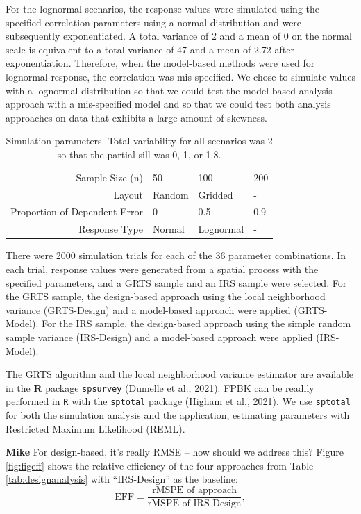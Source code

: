 \documentclass[]{elsarticle} %
\begin{document}
For the lognormal scenarios, the response values were simulated using
the specified correlation parameters using a normal distribution and
were subsequently exponentiated. A total variance of 2 and a mean of 0
on the normal scale is equivalent to a total variance of 47 and a mean
of 2.72 after exponentiation. Therefore, when the model-based methods
were used for lognormal response, the correlation was mis-specified. We
chose to simulate values with a lognormal distribution so that we could
test the model-based analysis approach with a mis-specified model and so
that we could test both analysis approaches on data that exhibits a
large amount of skewness.

\begin{table}[ht]
\centering
\begin{tabular}{r|lll}
   \hline
Sample Size (n) & 50 & 100 & 200 \\ 
  Layout & Random & Gridded & - \\ 
  Proportion of Dependent Error & 0 & 0.5 & 0.9 \\ 
  Response Type & Normal & Lognormal & - \\ 
   \hline
\end{tabular}
\caption{\label{tab:parmtab} Simulation parameters. Total variability for all scenarios was 2 so that the partial sill was 0, 1, or 1.8.} 
\end{table}

There were 2000 simulation trials for each of the 36 parameter
combinations. In each trial, response values were generated from a
spatial process with the specified parameters, and a GRTS sample and an
IRS sample were selected. For the GRTS sample, the design-based approach
using the local neighborhood variance (GRTS-Design) and a model-based
approach were applied (GRTS-Model). For the IRS sample, the design-based
approach using the simple random sample variance (IRS-Design) and a
model-based approach were applied (IRS-Model).

The GRTS algorithm and the local neighborhood variance estimator are
available in the \textbf{\textsf{R}} package \texttt{spsurvey} (Dumelle
et al., 2021). FPBK can be readily performed in \texttt{R} with the
\texttt{sptotal} package (Higham et al., 2021). We use \texttt{sptotal}
for both the simulation analysis and the application, estimating
parameters with Restricted Maximum Likelihood (REML).

\textbf{Mike} For design-based, it's really RMSE -- how should we
address this? Figure \ref{fig:figeff} shows the relative efficiency of
the four approaches from Table \ref{tab:designanalysis} with
``IRS-Design'' as the baseline: \mbox{} \begin{equation*}
\text{EFF} = \frac{\text{rMSPE of approach}}{\text{rMSPE of IRS-Design}},
\end{equation*}
\end{document}
